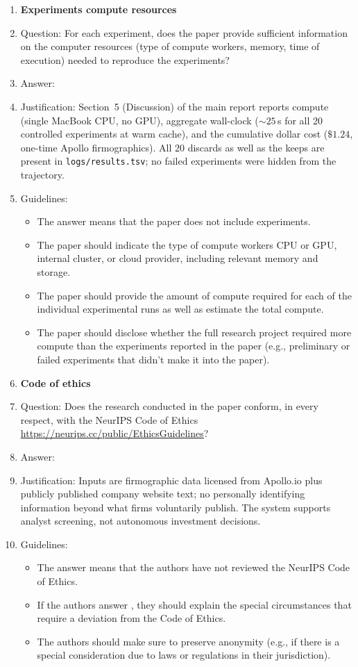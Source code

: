 \documentclass{article}
\begin{document}
\begin{enumerate}
\item {\bf Experiments compute resources}
    \item[] Question: For each experiment, does the paper provide sufficient information on the computer resources (type of compute workers, memory, time of execution) needed to reproduce the experiments?
    \item[] Answer: \answerYes{}
    \item[] Justification: Section~5 (Discussion) of the main report reports compute (single MacBook CPU, no GPU), aggregate wall-clock ($\sim 25$\,s for all 20 controlled experiments at warm cache), and the cumulative dollar cost ($\$1.24$, one-time Apollo firmographics). All 20 discards as well as the keeps are present in \texttt{logs/results.tsv}; no failed experiments were hidden from the trajectory.
    \item[] Guidelines:
    \begin{itemize}
        \item The answer \answerNA{} means that the paper does not include experiments.
        \item The paper should indicate the type of compute workers CPU or GPU, internal cluster, or cloud provider, including relevant memory and storage.
        \item The paper should provide the amount of compute required for each of the individual experimental runs as well as estimate the total compute.
        \item The paper should disclose whether the full research project required more compute than the experiments reported in the paper (e.g., preliminary or failed experiments that didn't make it into the paper).
    \end{itemize}

\item {\bf Code of ethics}
    \item[] Question: Does the research conducted in the paper conform, in every respect, with the NeurIPS Code of Ethics \url{https://neurips.cc/public/EthicsGuidelines}?
    \item[] Answer: \answerYes{}
    \item[] Justification: Inputs are firmographic data licensed from Apollo.io plus publicly published company website text; no personally identifying information beyond what firms voluntarily publish. The system supports analyst screening, not autonomous investment decisions.
    \item[] Guidelines:
    \begin{itemize}
        \item The answer \answerNA{} means that the authors have not reviewed the NeurIPS Code of Ethics.
        \item If the authors answer \answerNo, they should explain the special circumstances that require a deviation from the Code of Ethics.
        \item The authors should make sure to preserve anonymity (e.g., if there is a special consideration due to laws or regulations in their jurisdiction).
    \end{itemize}



\end{enumerate}
\end{document}
